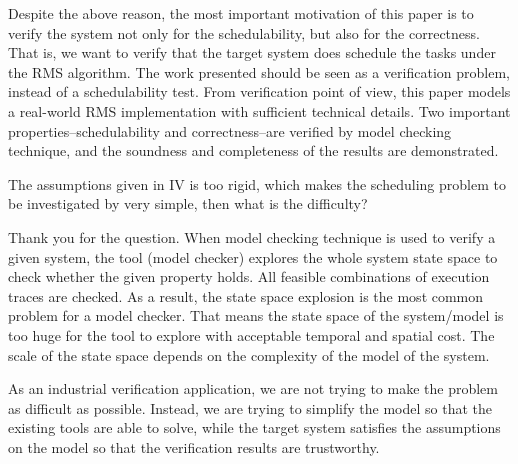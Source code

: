 \documentclass[10pt,journal]{IEEEtran}
\newcommand{\hide}[1]{\ignorespaces}
\newcommand{\ANSWER}{\medskip\noindent{\bf RESPONSE: }}
\newcommand{\COMMENT}{\medskip\noindent{\bf COMMENT: }}
\begin{document}
Despite the above reason, the most important motivation of this paper
is to verify the system not only for the schedulability, but also for
the correctness. That is, we want to verify that the target system
does schedule the tasks under the RMS algorithm. The work presented
should be seen as a verification problem, instead of a schedulability
test. From verification point of view, this paper models a real-world
RMS implementation with sufficient technical details. Two important
properties--schedulability and correctness--are verified by model
checking technique, and the soundness and completeness of the results
are demonstrated.

\hide{
is a very simple scheduling and is the optimum at the same time among
the fixed-priority ones, making it widely applied and sufficiently
investigated. Besides the ideal setting, the schedulability of RMS was
also investigated under different kinds of implementations with
consideration about overhead, as we discuss in the related work
section (Section VI). Despite the reason that the existing results do
not fit our target system using RMS, the most important motivation to
develop the work presented is that, we aim at verifying the system not
only for the schedulability, but also for the correctness. That is, we
want to verify that the target system does schedule the tasks under
the RMS algorithm. The work presented should be seen as a verification
problem, instead of a schedulability test.
}

\COMMENT 

The assumptions given in IV is too rigid, which makes the scheduling
problem to be investigated by very simple, then what is the
difficulty?

\ANSWER 

Thank you for the question. When model checking technique is used to
verify a given system, the tool (model checker) explores the whole
system state space to check whether the given property holds. All
feasible combinations of execution traces are checked. As a result,
the state space explosion is the most common problem for a model
checker. That means the state space of the system/model is too huge
for the tool to explore with acceptable temporal and spatial cost. The
scale of the state space depends on the complexity of the model of the
system.

As an industrial verification application, we are not trying to make
the problem as difficult as possible. Instead, we are trying to
simplify the model so that the existing tools are able to solve, while
the target system satisfies the assumptions on the model so that the
verification results are trustworthy.
\end{document}
